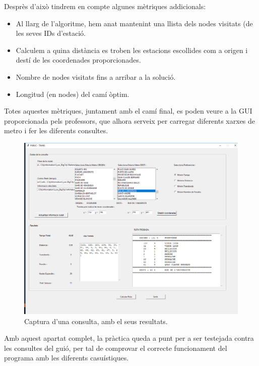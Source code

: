 \documentclass[a4paper,12pt,hidelinks]{article}
\begin{document}
        Desprès d'això tindrem en compte algunes mètriques addicionals:
        \begin{itemize}
            \item Al llarg de l’algoritme, hem anat mantenint una llista dels nodes visitats (de les seves IDs d’estació.
            \item Calculem a quina distància es troben les estacions escollides com a origen i destí de les coordenades proporcionades.
            \item Nombre de nodes visitats fins a arribar a la solució.
            \item Longitud (en nodes) del camí òptim.
        \end{itemize}
        
        Totes aquestes mètriques, juntament amb el camí final, es poden veure a la GUI proporcionada pels professors, que alhora serveix per carregar diferents xarxes de metro i fer les diferents consultes.

        \begin{figure}[h]
            \centering    
            \includegraphics[scale=0.3]{consulta.png}
            \caption{Captura d'una consulta, amb el seus resultats.}
        \end{figure}

        Amb aquest apartat complet, la pràctica queda a punt per a ser testejada contra les consultes del guió, per tal de comprovar el correcte funcionament del programa amb les diferents casuístiques.
    
    \pagebreak
    
\end{document}
